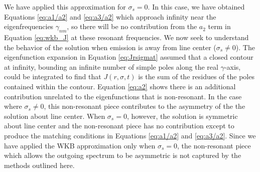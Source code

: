 \documentclass{aastex63}
\begin{document}
We have applied this approximation for $\sigma_s=0$. In this case, we have obtained Equations \ref{eq:a1/a2} and \ref{eq:a3/a2} which approach infinity near the eigenfrequencies $\gamma_{nm}$, so there will be no contribution from the $a_2$ term in Equation \ref{eq:wkb_J} at these resonant frequencies. We now seek to understand the behavior of the solution when emission is away from line center ($\sigma_s \neq 0$). The eigenfunction expansion in Equation \ref{eq:Jrsigmat} assumed that a closed contour at infinity, bounding an infinite number of simple poles along the real $\gamma$-axis, could be integrated to find that $J(r, \sigma, t)$ is the sum of the residues of the poles contained within the contour. Equation \ref{eq:a2} shows there is an additional contribution unrelated to the eigenfunctions that is non-resonant. In the case where $\sigma_s \neq 0$, this non-resonant piece contributes to the asymmetry of the the solution about line center. When $\sigma_s=0$, however, the solution is symmetric about line center and the non-resonant piece has no contribution except to produce the matching conditions in Equations \ref{eq:a1/a2} and \ref{eq:a3/a2}. Since we have applied the WKB approximation only when $\sigma_s = 0$, the non-resonant piece which allows the outgoing spectrum to be asymmetric is not captured by the methods outlined here.

{}

\end{document}
